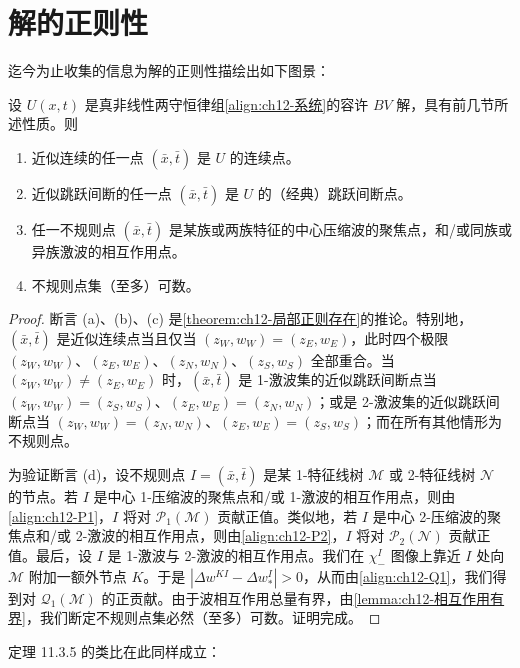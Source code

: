 \documentclass[../../main.tex]{subfiles}
\begin{document}
\section{解的正则性}\label{section:ch12-解的正则性}

迄今为止收集的信息为解的正则性描绘出如下图景：

\begin{theorem}\label{theorem:ch12-正则性}
设 $U(x,t)$ 是真非线性两守恒律组\eqref{align:ch12-系统}的容许 $BV$ 解，具有前几节所述性质。则
\begin{enumerate}
\item[\textup{(a)}] 近似连续的任一点 $(\bar x,\bar t)$ 是 $U$ 的连续点。
\item[\textup{(b)}] 近似跳跃间断的任一点 $(\bar x,\bar t)$ 是 $U$ 的（经典）跳跃间断点。
\item[\textup{(c)}] 任一不规则点 $(\bar x,\bar t)$ 是某族或两族特征的中心压缩波的聚焦点，和/或同族或异族激波的相互作用点。
\item[\textup{(d)}] 不规则点集（至多）可数。
\end{enumerate}
\end{theorem}

\begin{proof}
断言 (a)、(b)、(c) 是\cref{theorem:ch12-局部正则存在}的推论。特别地，$(\bar x,\bar t)$ 是近似连续点当且仅当 $(z_W,w_W)=(z_E,w_E)$，此时四个极限 $(z_W,w_W)$、$(z_E,w_E)$、$(z_N,w_N)$、$(z_S,w_S)$ 全部重合。当 $(z_W,w_W)\neq(z_E,w_E)$ 时，$(\bar x,\bar t)$ 是 1-激波集的近似跳跃间断点当 $(z_W,w_W)=(z_S,w_S)$、$(z_E,w_E)=(z_N,w_N)$；或是 2-激波集的近似跳跃间断点当 $(z_W,w_W)=(z_N,w_N)$、$(z_E,w_E)=(z_S,w_S)$；而在所有其他情形为不规则点。

为验证断言 (d)，设不规则点 $I=(\bar x,\bar t)$ 是某 1-特征线树 $\mathscr{M}$ 或 2-特征线树 $\mathscr{N}$ 的节点。若 $I$ 是中心 1-压缩波的聚焦点和/或 1-激波的相互作用点，则由\eqref{align:ch12-P1}，$I$ 将对 $\mathscr{P}_1(\mathscr{M})$ 贡献正值。类似地，若 $I$ 是中心 2-压缩波的聚焦点和/或 2-激波的相互作用点，则由\eqref{align:ch12-P2}，$I$ 将对 $\mathscr{P}_2(\mathscr{N})$ 贡献正值。最后，设 $I$ 是 1-激波与 2-激波的相互作用点。我们在 $\chi_-^I$ 图像上靠近 $I$ 处向 $\mathscr{M}$ 附加一额外节点 $K$。于是 $|\Delta w^{KI}-\Delta w_*^I|>0$，从而由\eqref{align:ch12-Q1}，我们得到对 $\mathscr{Q}_1(\mathscr{M})$ 的正贡献。由于波相互作用总量有界，由\cref{lemma:ch12-相互作用有界}，我们断定不规则点集必然（至多）可数。证明完成。
\end{proof}

定理 11.3.5 的类比在此同样成立：
\end{document}
